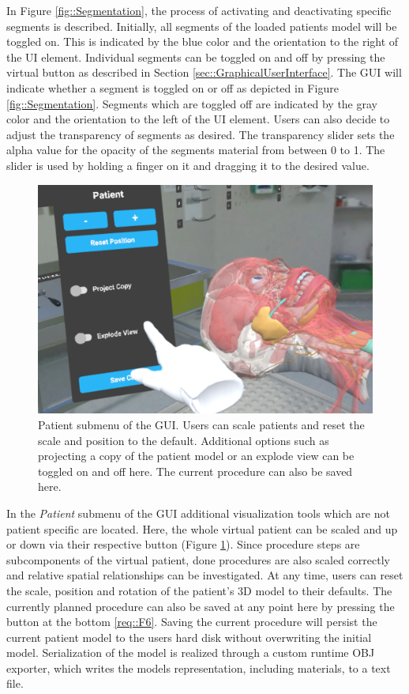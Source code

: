 In Figure \ref{fig::Segmentation}, the process of activating and deactivating specific segments is described.
Initially, all segments of the loaded patients model will be toggled on.
This is indicated by the blue color and the orientation to the right of the UI element.
Individual segments can be toggled on and off by pressing the virtual button as described in Section \ref{sec::GraphicalUserInterface}.
The GUI will indicate whether a segment is toggled on or off as depicted in Figure \ref{fig::Segmentation}.
Segments which are toggled off are indicated by the gray color and the orientation to the left of the UI element.
Users can also decide to adjust the transparency of segments as desired.
The transparency slider sets the alpha value for the opacity of the segments material from between 0 to 1.
The slider is used by holding a finger on it and dragging it to the desired value.

\begin{figure}[ht]
  \centering
  \includegraphics[width=\linewidth]{images/implementation/user_interface/patient_submenu.png}
  \caption{\label{fig::PatientVisualization}Patient submenu of the GUI. Users can scale patients and reset the scale and position to the default. Additional options such as projecting a 
  copy of the patient model or an explode view can be toggled on and off here. The current procedure can also be saved here.}
\end{figure}

In the \emph{Patient} submenu of the GUI additional visualization tools which are not patient specific are located.
Here, the whole virtual patient can be scaled and up or down via their respective button (Figure \ref{fig::PatientVisualization}).
Since procedure steps are subcomponents of the virtual patient, done procedures are also scaled correctly and relative spatial relationships can be investigated. 
At any time, users can reset the scale, position and rotation of the patient's 3D model to their defaults.
The currently planned procedure can also be saved at any point here by pressing the button at the bottom \ref{req::F6}.
Saving the current procedure will persist the current patient model to the users hard disk without overwriting the initial model.
Serialization of the model is realized through a custom runtime OBJ exporter, which writes the models representation, including materials, to a text file.

